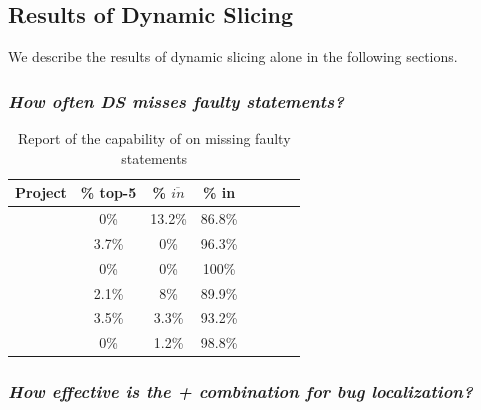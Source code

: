\documentclass{article}
\begin{document}
\subsection{Results of Dynamic Slicing}

We describe the results of dynamic slicing alone in the following sections.

\subsubsection{\textit{How often DS misses faulty statements?}}


\begin{table}[h]
	\centering
	\setlength{\tabcolsep}{4pt}
	\begin{tabular}{lccccccc}
		\toprule
		Project            &  \% top-5 & \%  $\overline{in}$  & \% in  \\ %
		\midrule
		\chart{} 	& 0\% & 13.2\% & 86.8\%   \\ %
		\closure{} 	& 3.7\% & 0\% & 96.3\%   \\ %
		\lang{} 	& 0\% & 0\%  & 100\%   \\ %
		\cmath{} 	& 2.1\% & 8\% & 89.9\%   \\ %
		\mockito{} 	& 3.5\% & 3.3\% & 93.2\%   \\ %
		\jtime{} 	& 0\% & 1.2\% & 98.8\%   \\ %
		\bottomrule
	\end{tabular}
	\caption {Report of the capability of \ds{} on missing faulty statements}
\end{table}
\normalsize



\subsubsection{\textit{How effective is the \sfl{}+\ds{} combination for bug localization?}}
\end{document}
